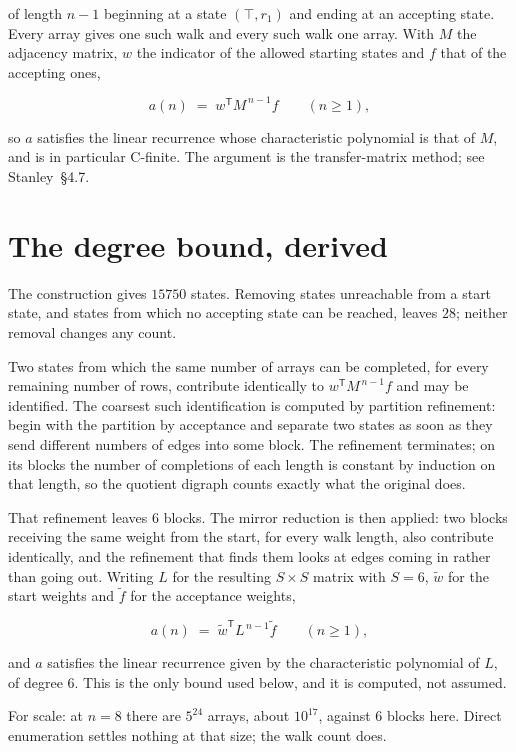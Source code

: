 \documentclass[11pt]{article}
\theoremstyle{definition}
\begin{document}
of length $n-1$ beginning at a state $(\top,r_1)$ and ending at an accepting state. Every array gives one such walk and every such walk one array. With $M$ the adjacency matrix, $w$ the indicator of the allowed starting states and $f$ that of the accepting ones,

\[a(n) \;=\; w^{\mathsf T} M^{\,n-1} f \qquad (n \ge 1),\]

so $a$ satisfies the linear recurrence whose characteristic polynomial is that of $M$, and is in particular C-finite. The argument is the transfer-matrix method; see Stanley~\S4.7.

\section{The degree bound, derived}

The construction gives $15750$ states. Removing states unreachable from a start state, and states from which no accepting state can be reached, leaves $28$; neither removal changes any count.

Two states from which the same number of arrays can be completed, for every remaining number of rows, contribute identically to $w^{\mathsf T}M^{\,n-1}f$ and may be identified. The coarsest such identification is computed by partition refinement: begin with the partition by acceptance and separate two states as soon as they send different numbers of edges into some block. The refinement terminates; on its blocks the number of completions of each length is constant by induction on that length, so the quotient digraph counts exactly what the original does.

That refinement leaves $6$ blocks. The mirror reduction is then applied: two blocks receiving the same weight from the start, for every walk length, also contribute identically, and the refinement that finds them looks at edges coming in rather than going out. Writing $L$ for the resulting $S \times S$ matrix with $S = 6$, $\tilde w$ for the start weights and $\tilde f$ for the acceptance weights,

\[a(n) \;=\; \tilde w^{\mathsf T} L^{\,n-1} \tilde f \qquad (n \ge 1),\]

and $a$ satisfies the linear recurrence given by the characteristic polynomial of $L$, of degree $6$. This is the only bound used below, and it is computed, not assumed.

For scale: at $n = 8$ there are $5^{24}$ arrays, about $10^{17}$, against $6$ blocks here. Direct enumeration settles nothing at that size; the walk count does.
\end{document}
